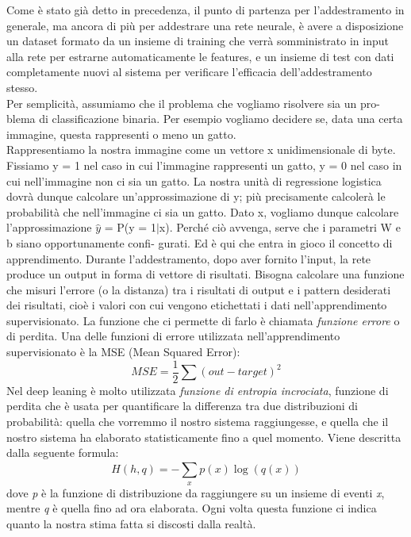 Come è stato già detto in precedenza, il punto di partenza per l’addestramento in generale, ma ancora di più per addestrare una rete neurale, 
è avere a disposizione un dataset formato da un insieme di training che verrà somministrato in
 input alla rete per estrarne automaticamente le features, e un insieme di test con dati completamente nuovi al sistema
  per verificare l'efficacia dell’addestramento stesso. \\
  Per semplicità, assumiamo che il problema che vogliamo risolvere sia un pro-
blema di classificazione binaria. Per esempio vogliamo decidere se, data una certa
immagine, questa rappresenti o meno un gatto.\\
Rappresentiamo la nostra immagine come un vettore x unidimensionale di byte.
Fissiamo y = 1 nel caso in cui l’immagine rappresenti un gatto, y = 0 nel caso in
cui nell’immagine non ci sia un gatto. La nostra unità di regressione logistica dovrà
dunque calcolare un’approssimazione di y; più precisamente calcolerà le probabilità
che nell’immagine ci sia un gatto.
Dato x, vogliamo dunque calcolare l'approssimazione 
$\hat{y}$ = P(y = 1$\mid$x). 
Perché ciò avvenga, serve che i parametri W e b siano opportunamente confi-
gurati. Ed è qui che entra in gioco il concetto di apprendimento.
  Durante l’addestramento, dopo aver fornito l'input,
   la rete produce un output in forma di
vettore di risultati. Bisogna calcolare una funzione che misuri l’errore (o la distanza) tra i
 risultati di output e i pattern desiderati dei risultati, cioè i valori con cui vengono etichettati i 
 dati nell’apprendimento supervisionato.
  La funzione che ci permette di farlo è chiamata \emph{funzione errore} o di perdita.
   Una delle funzioni di errore utilizzata nell’apprendimento supervisionato è la MSE (Mean Squared Error):
   \begin{equation} \label{2}
MSE = \frac{1}{2}\sum (out - target)^{2}
   \end{equation}
 Nel deep leaning è molto utilizzata \emph{funzione di entropia incrociata}, 
funzione di perdita che è usata per quantificare la differenza tra due distribuzioni di probabilità:
 quella che vorremmo il nostro sistema raggiungesse, e quella che il nostro sistema ha elaborato statisticamente
 fino a quel momento. Viene descritta dalla seguente formula:
 \[ H(h,q) = -\sum_{x}^{}p(x) \log (q(x))\] 
 dove \emph{p} è la funzione di distribuzione da raggiungere su un insieme di eventi \emph{x}, mentre \emph{q} 
 è quella fino ad ora elaborata. 
 Ogni volta questa funzione ci indica quanto la nostra stima fatta si discosti dalla realtà.\\

